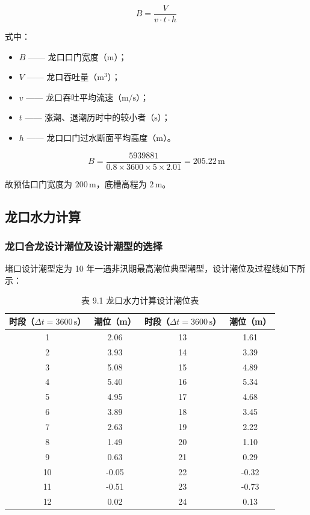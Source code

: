 \documentclass[UTF8, a4paper, 12pt]{ctexart} %
\begin{document}
\begin{equation}
    B = \frac{V}{v \cdot t \cdot h} 
\end{equation}

式中：
\begin{itemize}
    \item $B$ —— 龙口口门宽度（$\text{m}$）；
    \item $V$ —— 龙口吞吐量（$\text{m}^3$）；
    \item $v$ —— 龙口吞吐平均流速（$\text{m/s}$）；
    \item $t$ —— 涨潮、退潮历时中的较小者（$\text{s}$）；
    \item $h$ —— 龙口口门过水断面平均高度（$\text{m}$）。
\end{itemize}

\[
B = \frac{5939881}{0.8 \times 3600 \times 5 \times 2.01} = 205.22\,\text{m}
\]

故预估口门宽度为 $200\,\text{m}$，底槽高程为 $2\,\text{m}$。


\subsection{龙口水力计算}
\subsubsection{龙口合龙设计潮位及设计潮型的选择}

堵口设计潮型定为 10 年一遇非汛期最高潮位典型潮型，设计潮位及过程线如下所
示：

\begin{table}[h]
    \centering
    \caption{表 9.1 龙口水力计算设计潮位表}
    \begin{tabular}{cccc}
        \toprule
        \textbf{时段（$\Delta t = 3600\,\text{s}$）} & \textbf{潮位（m）} & \textbf{时段（$\Delta t = 3600\,\text{s}$）} & \textbf{潮位（m）} \\ 
        \midrule
        1  & 2.06 & 13 & 1.61 \\ 
        2  & 3.93 & 14 & 3.39 \\ 
        3  & 5.08 & 15 & 4.89 \\ 
        4  & 5.40 & 16 & 5.34 \\ 
        5  & 4.95 & 17 & 4.68 \\ 
        6  & 3.89 & 18 & 3.45 \\ 
        7  & 2.63 & 19 & 2.22 \\ 
        8  & 1.49 & 20 & 1.10 \\ 
        9  & 0.63 & 21 & 0.29 \\ 
        10 & -0.05 & 22 & -0.32 \\ 
        11 & -0.51 & 23 & -0.73 \\ 
        12 & 0.02 & 24 & 0.13 \\ 
        \bottomrule
    \end{tabular}
    \label{tab:dragon_port_tide_table}
\end{table}
\end{document}
